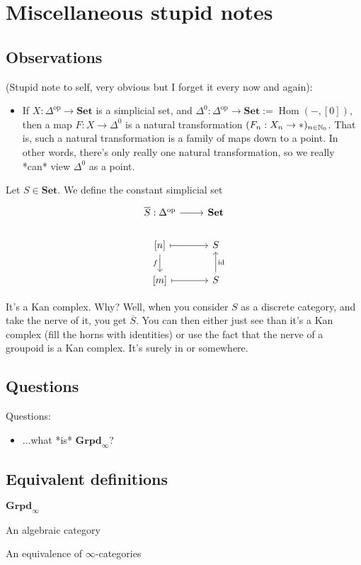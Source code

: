 \documentclass{MetricNotes2023}
\def\nat{\ensuremath\mathbb{N}}
\def\id{\ensuremath\text{id}}
\DeclareMathOperator{\Hom}{Hom}
\begin{document}


\section{Miscellaneous stupid notes}

\subsection{Observations}

(Stupid note to self, very obvious but I forget it every now and again):
\begin{itemize}
\item If \(X : \Delta^{\text{op}}\to \textbf{Set}\) is a simplicial set, and \(\Delta^0 : \Delta^{\text{op}}\to \textbf{Set}:= \Hom(-, [0])\), then a map \(F : X \to \Delta^0\) is a natural transformation \((F_n : X_n \to *)_{n \in \nat_0}\). That is, such a natural transformation is a family of maps down to a point. In other words, there's only really one natural transformation, so we really *can* view \(\Delta^0\) as a point. 
\end{itemize}

Let \(S \in \textbf{Set}\). We define the constant simplicial set 
\[\begin{tikzcd}
\overline{S} : \Delta^{\text{op}} \arrow[r, ""]  & \textbf{Set} \\
\left[n\right] \arrow[r, mapsto, swap, ""] \arrow[d, swap, "f"] & S\\
\left[m\right] \arrow[r, mapsto, swap, ""] & S \arrow[u, swap, "\id"]
\end{tikzcd}\]

It's a Kan complex. Why? Well, when you consider \(S\) as a discrete category, and take the nerve of it, you get \(\overline{S}\). You can then either just see than it's a Kan complex (fill the horns with identities) or use the fact that the nerve of a groupoid is a Kan complex. It's surely in \autocite{lurie2008higher} or \autocite{kerodon} somewhere. 

\subsection{Questions}

Questions:
\begin{itemize}
\item ...what *is* \(\textbf{Grpd}_\infty\)?
\end{itemize}

\subsection{Equivalent definitions}

\(\textbf{Grpd}_\infty\) 

An algebraic category

An equivalence of \(\infty\)-categories


\printbibliography
\end{document}
